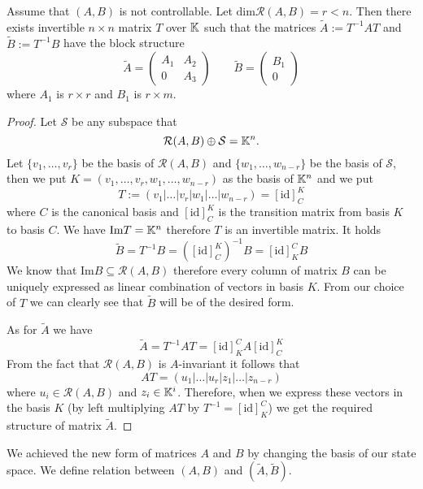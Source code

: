 \begin{theorem}
	\label{theorem:decomp}
	Assume that $(A,B)$ is not controllable. Let $\text{dim}\mathcal{R}(A,B)=r<n$. Then there exists invertible $n\times n$ matrix $T$ over $\mathbb{K}$ such that the matrices $\widetilde{A}:=T^{-1}AT$ and $\widetilde{B}:=T^{-1}B$ have the block structure 
	\begin{equation*}
		\widetilde{A}=
		\begin{pmatrix}
			A_1 & A_2 \\
			0   & A_3 
		\end{pmatrix}
		\qquad
		\widetilde{B}=
		\begin{pmatrix}
			B_1  \\
			0
		\end{pmatrix}
	\end{equation*}
	where $A_1$ is $r \times r$ and $B_1$ is $r \times m$.
\end{theorem}

\begin{proof}
	Let $\mathcal{S}$ be any subspace that $$\mathcal{R}(A,B)\oplus\mathcal{S}=\mathbb{K}^n.$$ Let $\{v_1,\ldots,v_r\}$ be the basis of $\mathcal{R}(A,B)$ and $\{w_1,\ldots,w_{n-r}\}$ be the basis of $\mathcal{S}$, then we put $K=(v_1,\ldots,v_r,w_1,\ldots,w_{n-r})$ as the basis of $\mathbb{K}^n$ and we put $$T:=(v_1|\ldots|v_r|w_1|\ldots|w_{n-r})=[\text{id}]^K_C$$ where $C$ is the canonical basis and $[\text{id}]^K_C$ is the transition matrix from basis $K$ to basis $C$. We have $\text{Im}T=\mathbb{K}^n$ therefore $T$ is an invertible matrix. It holds $$\widetilde{B}=T^{-1}B=([\text{id}]^K_C)^{-1}B=[\text{id}]^C_KB$$ We know that $\text{Im}B\subseteq\mathcal{R}(A,B)$ therefore every column of matrix $B$ can be uniquely expressed as linear combination of vectors in basis $K$. From our choice of $T$ we can clearly see that $\widetilde{B}$ will be of the desired form.
	
	As for $\widetilde{A}$ we have $$\widetilde{A}=T^{-1}AT=[\text{id}]^C_KA[\text{id}]^K_C$$ From the fact that $\mathcal{R}(A,B)$ is $A$-invariant it follows that $$AT=(u_1|\ldots|u_r|z_1|\ldots|z_{n-r})$$ where $u_i \in \mathcal{R}(A,B)$ and $z_i \in \mathbb{K}^i$. Therefore, when we express these vectors in the basis $K$ (by left multiplying $AT$ by $T^{-1}=[\text{id}]^C_K$) we get the required structure of matrix $\widetilde{A}$.
\end{proof}

We achieved the new form of matrices $A$ and $B$ by changing the basis of our state space. We define relation between $(A,B)$ and $(\widetilde{A},\widetilde{B}).$

